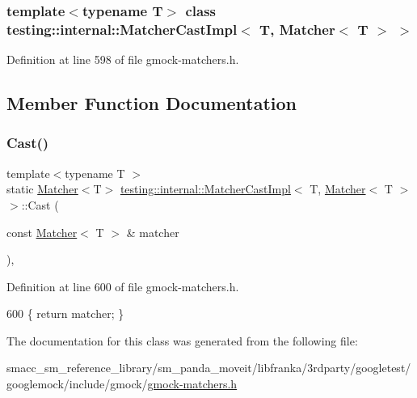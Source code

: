 \subsubsection*{template$<$typename T$>$\newline
class testing\+::internal\+::\+Matcher\+Cast\+Impl$<$ T, Matcher$<$ T $>$ $>$}



Definition at line 598 of file gmock-\/matchers.\+h.



\subsection{Member Function Documentation}
\mbox{\label{classtesting_1_1internal_1_1MatcherCastImpl_3_01T_00_01Matcher_3_01T_01_4_01_4_ac945132186fcbe0e0d2d8c207d730026}} 
\subsubsection{\texorpdfstring{Cast()}{Cast()}}
{\footnotesize\ttfamily template$<$typename T $>$ \\
static \hyperlink{classtesting_1_1Matcher}{Matcher}$<$T$>$ \hyperlink{classtesting_1_1internal_1_1MatcherCastImpl}{testing\+::internal\+::\+Matcher\+Cast\+Impl}$<$ T, \hyperlink{classtesting_1_1Matcher}{Matcher}$<$ T $>$ $>$\+::Cast (\begin{DoxyParamCaption}\item[{const \hyperlink{classtesting_1_1Matcher}{Matcher}$<$ T $>$ \&}]{matcher }\end{DoxyParamCaption})\hspace{0.3cm}{\ttfamily [inline]}, {\ttfamily [static]}}



Definition at line 600 of file gmock-\/matchers.\+h.


\begin{DoxyCode}
600 \{ \textcolor{keywordflow}{return} matcher; \}
\end{DoxyCode}


The documentation for this class was generated from the following file\+:\begin{DoxyCompactItemize}
\item 
smacc\+\_\+sm\+\_\+reference\+\_\+library/sm\+\_\+panda\+\_\+moveit/libfranka/3rdparty/googletest/googlemock/include/gmock/\hyperlink{gmock-matchers_8h}{gmock-\/matchers.\+h}\end{DoxyCompactItemize}
